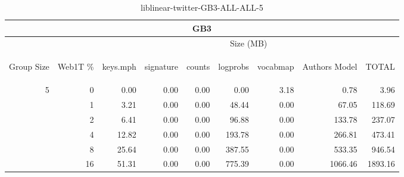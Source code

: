 \begin{center}
\begin{table}[htbp]
\begin{tabular}{ | r | r | r | r | r | r | r | r | r |}
\hline
\multicolumn{9}{|c|}{GB3}\\
\hline
 & & \multicolumn{7}{|c|}{Size (MB)}\\ \cline{3-9}
\begin{sideways}Group Size\end{sideways} & \begin{sideways}Web1T \% \end{sideways} & \begin{sideways}keys.mph\end{sideways} & \begin{sideways}signature\end{sideways} & \begin{sideways}counts\end{sideways} & \begin{sideways}logprobs\end{sideways} & \begin{sideways}vocabmap\end{sideways} & \begin{sideways}Authors Model \end{sideways} & \begin{sideways}TOTAL\end{sideways}\\
\hline
\multirow{5}{*}{5}
 & 0 & 0.00 & 0.00 & 0.00 & 0.00 & 3.18 & 0.78 & 3.96\\ \cline{2-9}
 & 1 & 3.21 & 0.00 & 0.00 & 48.44 & 0.00 & 67.05 & 118.69\\ \cline{2-9}
 & 2 & 6.41 & 0.00 & 0.00 & 96.88 & 0.00 & 133.78 & 237.07\\ \cline{2-9}
 & 4 & 12.82 & 0.00 & 0.00 & 193.78 & 0.00 & 266.81 & 473.41\\ \cline{2-9}
 & 8 & 25.64 & 0.00 & 0.00 & 387.55 & 0.00 & 533.35 & 946.54\\ \cline{2-9}
 & 16 & 51.31 & 0.00 & 0.00 & 775.39 & 0.00 & 1066.46 & 1893.16\\ \cline{2-9}
\hline
\end{tabular}
\caption{liblinear-twitter-GB3-ALL-ALL-5}
\label{table:liblinear-twitter-GB3-ALL-ALL-5}
\end{table}
\end{center}

